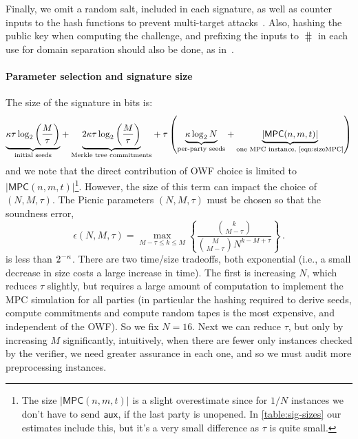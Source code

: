 Finally, we omit a random salt, included in each signature, as well as counter
inputs to the hash functions to prevent multi-target
attacks~\cite{EC:DinNad19}. Also, hashing the public key when computing the
challenge, and prefixing the inputs to $\hash$ in each use for domain
separation should also be done, as in~\cite{picnic-spec}. 

\newcommand{\textunderbrace}[2]{{%
  \underbrace{#1}_{\text{#2}}
}}

\paragraph{Parameter selection and signature size}
The size of the signature in bits is:
\begin{align*}
\textunderbrace{\secpar\tau\log_2\left(\frac{M}{\tau}\right)}{initial seeds} + 
\textunderbrace{2\secpar\tau\log_2\left(\frac{M}{\tau}\right)}{Merkle tree commitments} + 
\tau\left( 
     \textunderbrace{\secpar\log_2N}{per-party seeds}  + 
     \textunderbrace{|\textsf{MPC}(n,m,t)|}{one MPC instance, \cref{eqn:sizeMPC}} 
\right)
\end{align*} 
and we note that the direct contribution of OWF choice is limited to
$|\textsf{MPC}(n,m,t)|$\footnote{The size $|\textsf{MPC}(n,m,t)|$ is a slight
overestimate since for $1/N$ instances we don't have to send $\textsf{aux}$, if the
last party is unopened. In \cref{table:sig-sizes} our estimates include this,
but it's a very small difference as $\tau$ is quite small. }.  However, the
size of this term can impact the choice of $(N,M,\tau)$.  The Picnic parameters
$(N, M, \tau)$ must be chosen so that the soundness error, 
\begin{equation*} \label{eqn:soundness}
    \epsilon(N,M,\tau) = \max_{M-\tau \le k \le M} \left\lbrace  \frac{\binom{k}{M-\tau} }{\binom{M}{M-\tau} N^{k-M+\tau} } \right\rbrace\,.
\end{equation*}
is less than $2^{-\kappa}$.
There are two time/size tradeoffs, both exponential (i.e., a small decrease in
size costs a large increase in time).  The first is increasing $N$, which
reduces $\tau$ slightly, but requires a large amount of computation to
implement the MPC simulation for all parties (in particular the hashing
required to derive seeds, compute commitments and compute random tapes is the
most expensive, and independent of the OWF).  So we fix $N = 16$. 
Next we can reduce $\tau$, but only by increasing $M$ significantly,
intuitively, when there are fewer only instances checked by the verifier, we
need greater assurance in each one, and so we must audit more preprocessing
instances. 

